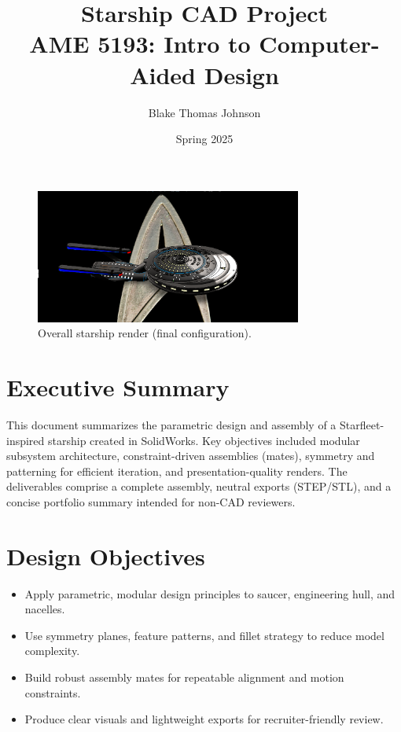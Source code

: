 \documentclass[12pt]{article}
\title{\textbf{Starship CAD Project} \\
       \large AME 5193: Intro to Computer-Aided Design}
\author{Blake Thomas Johnson}
\date{Spring 2025}
\begin{document}
\maketitle

\begin{figure}[H]
    \centering
    \includegraphics[width=0.78\textwidth]{final_1.png}
    \caption{Overall starship render (final configuration).}
\end{figure}

\clearpage

\section*{Executive Summary}
This document summarizes the parametric design and assembly of a Starfleet-inspired
starship created in SolidWorks. Key objectives included modular subsystem architecture,
constraint-driven assemblies (mates), symmetry and patterning for efficient iteration,
and presentation-quality renders. The deliverables comprise a complete assembly,
neutral exports (STEP/STL), and a concise portfolio summary intended for non-CAD
reviewers.

\section*{Design Objectives}
\begin{itemize}
    \item Apply parametric, modular design principles to saucer, engineering hull, and nacelles.
    \item Use symmetry planes, feature patterns, and fillet strategy to reduce model complexity.
    \item Build robust assembly mates for repeatable alignment and motion constraints.
    \item Produce clear visuals and lightweight exports for recruiter-friendly review.
\end{itemize}
\end{document}
